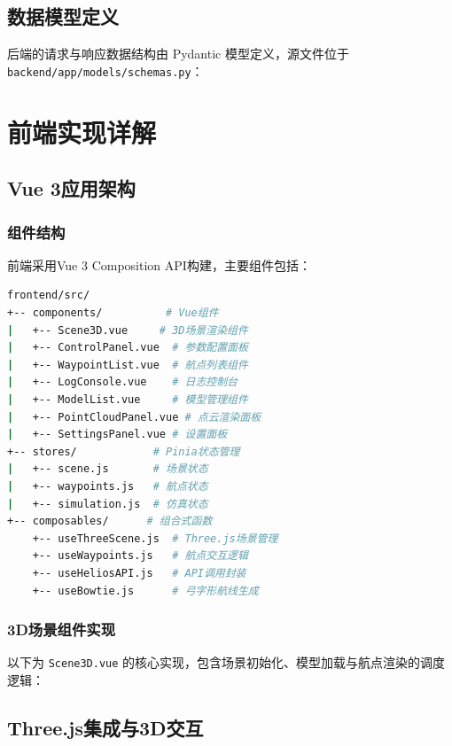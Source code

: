 \documentclass[a4paper,fleqn]{cas-sc}
\begin{document}
\subsection{数据模型定义}

后端的请求与响应数据结构由 Pydantic 模型定义，源文件位于 \texttt{backend/app/models/schemas.py}：



\section{前端实现详解}\label{sec:frontend}

\subsection{Vue 3应用架构}

\subsubsection{组件结构}
前端采用Vue 3 Composition API构建，主要组件包括：
\begin{lstlisting}[language=bash,caption=前端组件结构]
frontend/src/
+-- components/          # Vue组件
|   +-- Scene3D.vue     # 3D场景渲染组件
|   +-- ControlPanel.vue  # 参数配置面板
|   +-- WaypointList.vue  # 航点列表组件
|   +-- LogConsole.vue    # 日志控制台
|   +-- ModelList.vue     # 模型管理组件
|   +-- PointCloudPanel.vue # 点云渲染面板
|   +-- SettingsPanel.vue # 设置面板
+-- stores/            # Pinia状态管理
|   +-- scene.js       # 场景状态
|   +-- waypoints.js   # 航点状态
|   +-- simulation.js  # 仿真状态
+-- composables/      # 组合式函数
    +-- useThreeScene.js  # Three.js场景管理
    +-- useWaypoints.js   # 航点交互逻辑
    +-- useHeliosAPI.js   # API调用封装
    +-- useBowtie.js      # 弓字形航线生成
\end{lstlisting}

\subsubsection{3D场景组件实现}
以下为 \texttt{Scene3D.vue} 的核心实现，包含场景初始化、模型加载与航点渲染的调度逻辑：



\subsection{Three.js集成与3D交互}
\end{document}
